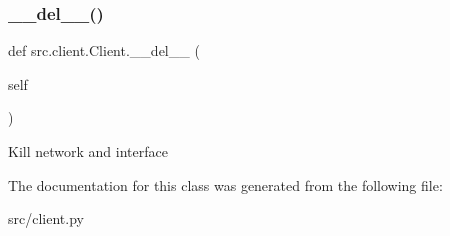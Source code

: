 \subsubsection{\texorpdfstring{\+\_\+\+\_\+del\+\_\+\+\_\+()}{\_\_del\_\_()}}
{\footnotesize\ttfamily def src.\+client.\+Client.\+\_\+\+\_\+del\+\_\+\+\_\+ (\begin{DoxyParamCaption}\item[{}]{self }\end{DoxyParamCaption})}

\begin{DoxyVerb}Kill network and interface \end{DoxyVerb}
 

The documentation for this class was generated from the following file\+:\begin{DoxyCompactItemize}
\item 
src/client.\+py\end{DoxyCompactItemize}
